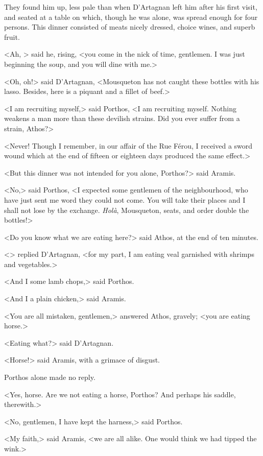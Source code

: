 They found him up, less pale than when D'Artagnan left him after his first visit, and seated at a table on which, though he was alone, was spread enough for four persons. This dinner consisted of meats nicely dressed, choice wines, and superb fruit. 

<Ah, > said he, rising, <you come in the nick of time, gentlemen. I was just beginning the soup, and you will dine with me.> 

<Oh, oh!> said D'Artagnan, <Mousqueton has not caught these bottles with his lasso. Besides, here is a piquant  and a fillet of beef.> 

<I am recruiting myself,> said Porthos, <I am recruiting myself. Nothing weakens a man more than these devilish strains. Did you ever suffer from a strain, Athos?> 

<Never! Though I remember, in our affair of the Rue Férou, I received a sword wound which at the end of fifteen or eighteen days produced the same effect.> 

<But this dinner was not intended for you alone, Porthos?> said Aramis. 

<No,> said Porthos, <I expected some gentlemen of the neighbourhood, who have just sent me word they could not come. You will take their places and I shall not lose by the exchange. \textit{Holà}, Mousqueton, seats, and order double the bottles!> 

<Do you know what we are eating here?> said Athos, at the end of ten minutes. 

<> replied D'Artagnan, <for my part, I am eating veal garnished with shrimps and vegetables.> 

<And I some lamb chops,> said Porthos. 

<And I a plain chicken,> said Aramis. 

<You are all mistaken, gentlemen,> answered Athos, gravely; <you are eating horse.> 

<Eating what?> said D'Artagnan. 

<Horse!> said Aramis, with a grimace of disgust. 

Porthos alone made no reply. 

<Yes, horse. Are we not eating a horse, Porthos? And perhaps his saddle, therewith.> 

<No, gentlemen, I have kept the harness,> said Porthos. 

<My faith,> said Aramis, <we are all alike. One would think we had tipped the wink.> 

